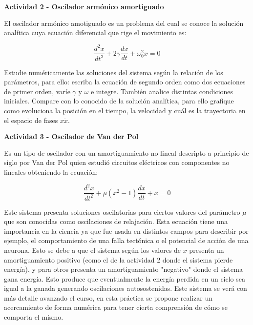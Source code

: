 \documentclass[a4paper,12pt]{article}
\begin{document}
{\Large \textbf{Actividad 2 - Oscilador arm\'onico amortiguado}}

El oscilador arm\'onico amotiguado es un problema del cual se conoce la soluci\'on anal\'itica cuya ecuaci\'on diferencial que rige el movimiento es:

\begin{equation}
	\frac{d^2 x}{dt^2} + 2\gamma\frac{dx}{dt} + \omega_0^2x = 0
\end{equation}

Estudie num\'ericamente las soluciones del sistema seg\'un la relaci\'on de los par\'ametros, para ello: escriba la ecuaci\'on de segundo orden como dos ecuaciones de primer orden, var\'ie $\gamma$ y $\omega$ e integre. Tambi\'en analice distintas condiciones iniciales. Compare con lo conocido de la soluci\'on anal\'itica, para ello grafique como evoluciona la posici\'on en el tiempo, la velocidad y cu\'al es la trayectoria en el espacio de fases $x  \ddot{x}$.\newline


{\Large \textbf{Actividad 3 - Oscilador de Van der Pol}}

Es un tipo de oscilador con un amortiguamiento no lineal descripto a principio de siglo por Van der Pol quien estudi\'o circuitos el\'ectricos con componentes no lineales obteniendo la ecuaci\'on:

\begin{equation}
	\frac{d^2 x}{dt^2} + \mu(x^2-1)\frac{dx}{dt} + x = 0
\end{equation}

Este sistema presenta soluciones oscilatorias para ciertos valores del par\'ametro $\mu$ que son conocidas como oscilaciones de relajaci\'on. Esta ecuaci\'on tiene una importancia en la ciencia ya que fue usada en distintos campos para describir por ejemplo, el comportamiento de una falla tect\'onica o el potencial de acci\'on de una neurona. Esto se debe a que el sistema seg\'un los valores de $x$ presenta un amortiguamiento positivo (como el de la actividad 2 donde el sistema pierde energ\'ia), y para otros presenta un amortiguamiento "negativo" donde el sistema gana energ\'ia. Esto produce que eventualmente la energ\'ia perdida en un ciclo sea igual a la ganada generando oscilaciones autosostenidas. Este sistema se ver\'a con m\'as detalle avanzado el curso, en esta pr\'actica se propone realizar un acercamiento de forma num\'erica para tener cierta comprensi\'on de c\'omo se comporta el mismo.
\end{document}
